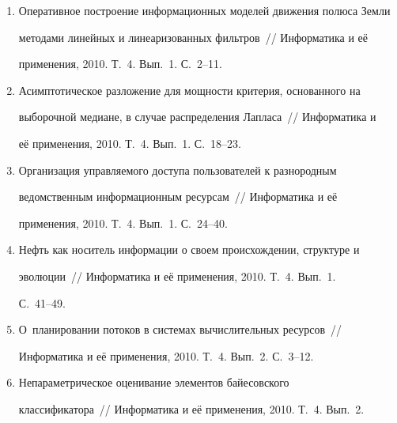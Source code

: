   


  


  \noindent


  \begin{enumerate}[1.]


\item {}


Оперативное построение информационных моделей движения полюса Земли 


методами линейных и линеаризованных фильтров~/\!\!/ Информатика и её 


применения, 2010. Т.~4. Вып.~1. С.~2--11.


\item {}


Асимптотическое разложение для мощности критерия, основанного на 


выборочной медиане, в случае распределения Лапласа~/\!\!/  Информатика и 


её применения, 2010. Т.~4. Вып.~1. С.~18--23.


\item {}


Организация управляемого доступа пользователей к разнородным 


ведомственным информационным ресурсам~/\!\!/  Информатика и её 


применения, 2010. Т.~4. Вып.~1. С.~24--40.


\item {}


Нефть как носитель информации о своем происхождении, структуре и 


эволюции~/\!\!/  Информатика и её применения, 2010. Т.~4. Вып.~1. 


С.~41--49.


\item {}


О~планировании потоков в системах вычислительных ресурсов~/\!\!/  


Информатика и её применения, 2010. Т.~4. Вып.~2. С.~3--12.


\item {}


Непараметрическое оценивание элементов байесовского 


классификатора~/\!\!/  Информатика и её применения, 2010. Т.~4. Вып.~2. 



\end{enumerate}

